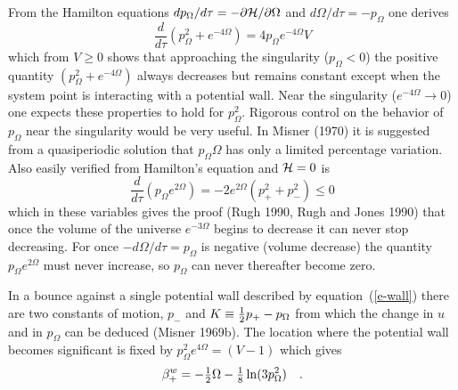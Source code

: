{}From the Hamilton equations $dp_\Omega/d\tau =
-\partial{\cal H}/\partial\Omega$ and $d\Omega/d\tau = - p_\Omega$
one derives
\begin{equation}
  \frac{d}{d\tau}\left(p_\Omega^2 + e^{-4\Omega}\right) = 4p_\Omega
        e^{-4\Omega} V
\end{equation}
which from $V \geq 0$ shows that approaching the singularity
($p_\Omega < 0$) the positive quantity $(p_\Omega^2 + e^{-4\Omega})$
always decreases but remains constant except when the system point is
interacting with a potential wall.  Near the singularity
($e^{-4\Omega}\rightarrow 0 $) one expects these properties to hold
for $p_\Omega^2$. Rigorous control on the behavior of $p_\Omega$ near
the singularity would be very useful.  In Misner (1970) it is
suggested from a quasiperiodic solution that $p_\Omega \Omega$ has
only a limited percentage variation.  Also easily verified from
Hamilton's equation and ${\cal H} = 0$ is
\begin{equation}
  \frac{d}{d\tau}\left(p_\Omega  e^{2\Omega}\right) =- 2
        e^{2\Omega} (p_+^2 + p_-^2) \leq 0
\end{equation}
which in these variables gives the proof (Rugh 1990, Rugh and Jones
1990) that once the volume of the universe $e^{-3\Omega}$ begins to
decrease it can never stop decreasing.  For once $-d\Omega/d\tau =
p_\Omega$ is negative (volume decrease) the quantity $p_\Omega
e^{2\Omega}$ must never increase, so $p_\Omega$ can never thereafter
become zero.


In a bounce against a single potential wall described by
equation~(\ref{e-wall}) there are two constants of motion, $p_-$ and
$K \equiv \mbox{$\frac{1}{2}$} p_+ - p_\Omega$ from which the change in $u$ and in
$p_\Omega$ can be deduced (Misner 1969b).
The location where the potential wall becomes significant is fixed by
$p_\Omega^2 e^{4\Omega} = (V - 1)$ which gives
\begin{equation}
  \beta^w_+ = -\mbox{$\frac{1}{2}$}\Omega - \mbox{$\frac{1}{8}$} \ln (3p_\Omega^2)
            \quad .
\end{equation}


